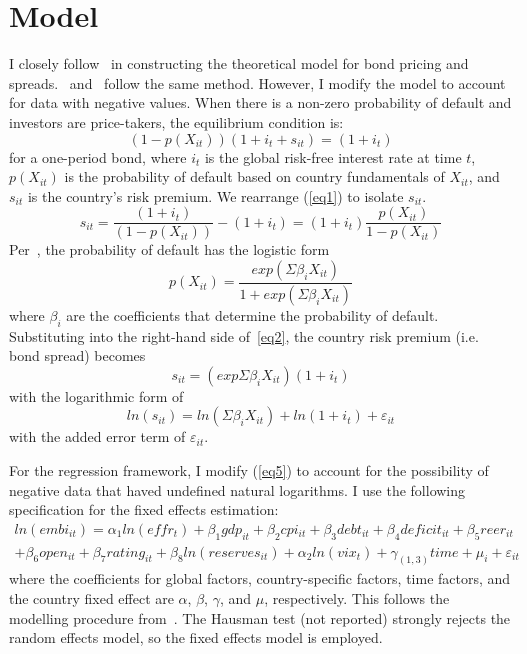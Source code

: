 \documentclass[12pt]{article}
\begin{document}
\section{Model}
\label{section:model}
I closely follow~\textcite{edwards86} in constructing the theoretical model for bond pricing and spreads.~\textcite{csonto13} and~\textcite{comelli12} follow the same method. However, I modify the model to account for data with negative values. When there is a non-zero probability of default and investors are price-takers, the equilibrium condition is:
\begin{equation}
\label{eq1}
(1-p(X_{it}))(1+i_{t}+s_{it}) = (1+i_{t})
\end{equation}
 for a one-period bond, where $i_{t}$ is the global risk-free interest rate at time $t$, $p(X_{it})$ is the probability of default based on country fundamentals of $X_{it}$, and $s_{it}$ is the country's risk premium. We rearrange (\ref{eq1}) to isolate $s_{it}$.
 \begin{equation}
 \label{eq2}
 s_{it} = \dfrac{(1+i_{t})}{(1-p(X_{it}))}-(1+i_{t}) = (1+i_{t})\dfrac{p(X_{it})}{1-p(X_{it})}
 \end{equation}
 Per~\textcite{edwards86}, the probability of default has the logistic form
\begin{equation}
\label{eq3}
p(X_{it}) = \dfrac{exp(\Sigma \beta_{i}X_{it})}{1+exp(\Sigma \beta_{i}X_{it})}
\end{equation}
where $\beta_{i}$ are the coefficients that determine the probability of default. Substituting into the right-hand side of~\ref{eq2}, the country risk premium (i.e. bond spread) becomes
\begin{equation}
\label{eq4}
 s_{it} = (exp \Sigma \beta_{i}X_{it})(1+i_{t})
\end{equation}
with the logarithmic form of 
\begin{equation}
\label{eq5}
 ln(s_{it}) = ln(\Sigma \beta_{i}X_{it}) + ln(1+i_{t}) + \varepsilon_{it} 
\end{equation}
with the added error term of $\varepsilon_{it}$.

For the regression framework, I modify (\ref{eq5}) to account for the possibility of negative data that haved undefined natural logarithms. I use the following specification for the fixed effects estimation:
\begin{multline}
\label{eqn6}
ln(embi_{it}) = \alpha_{1}ln(effr_{t}) + \beta_{1}gdp_{it} + \beta_{2}cpi_{it} + \beta_{3}debt_{it} + \beta_{4}deficit_{it} + \beta_{5}reer_{it}\\ + \beta_{6}open_{it} + \beta_{7}rating_{it} + \beta_{8}ln(reserves_{it}) + \alpha_{2}ln(vix_{t}) + \gamma_{(1,3)}time + \mu_{i} + \varepsilon_{it}
\end{multline}
where the coefficients for global factors, country-specific factors, time factors, and the country fixed effect are $\alpha$, $\beta$, $\gamma$, and $\mu$, respectively. This follows the modelling procedure from~\textcite{capelli19}. The Hausman test (not reported) strongly rejects the random effects model, so the fixed effects model is employed.
%
%
%
% 
\end{document}

